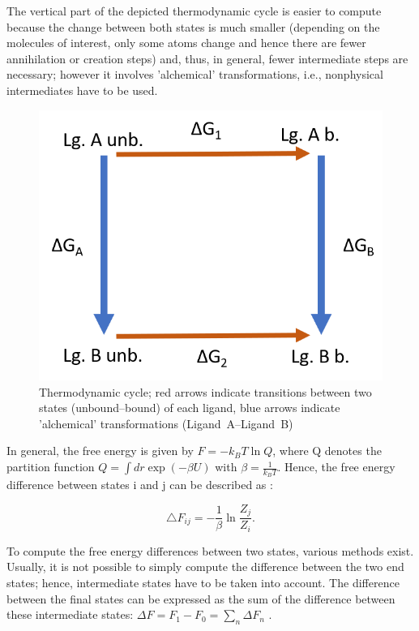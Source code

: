 The vertical part of the depicted thermodynamic cycle is easier 
to compute because the change between both states is much smaller
(depending on the molecules of interest, only some atoms change and hence there are fewer annihilation or creation steps) and, thus, in general, fewer intermediate steps
are necessary; however it involves 'alchemical' transformations, i.e.,
nonphysical intermediates have to be used. 
\begin{figure}
\includegraphics[scale=0.8]{cycle1}\caption{Thermodynamic cycle; red arrows indicate transitions between two states
(unbound--bound) of each ligand, blue arrows indicate 'alchemical'
transformations (Ligand~A--Ligand~B)\label{fig:cycle}}

\end{figure}

In general, the free energy is given by $F=-k_{B}T\ln Q$, where Q denotes the partition function $Q=\int dr\exp\left(-\beta U\right)$
with $\beta=\frac{1}{k_{B}T}$. Hence, the free energy difference between
states i and j can be described as \cite{Shirts.2013}:

\begin{equation}
\bigtriangleup F_{ij}=-\frac{1}{\beta}\ln\frac{Z_{j}}{Z_{i}}.
\end{equation}

To compute the free energy differences between two states, various
methods exist. Usually, it is not possible to simply compute the difference
between the two end states; hence, intermediate states have to be taken
into account. The difference between the final states can be expressed
as the sum of the difference between these intermediate states: $\Delta F=F_{1}-F_{0}=\sum_{n}\Delta F_{n}$
\cite{Mey.2020}.


